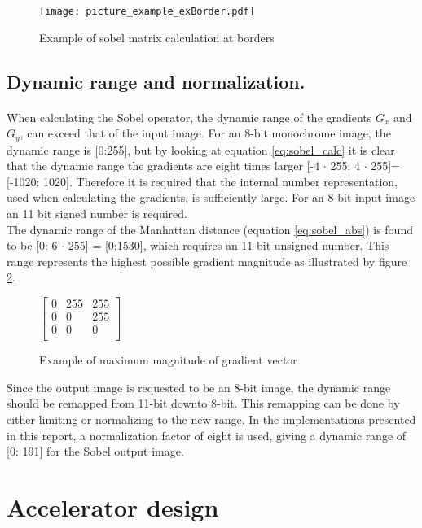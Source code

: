 \begin{figure}[H]
	\centering
	\texttt{[image: picture\_example\_exBorder.pdf]}
	\caption{Example of sobel matrix calculation at borders}
	\label{fig:pic_matrix_exBorder}
\end{figure}  

\subsection{Dynamic range and normalization.}
\paragraph*{}
When calculating the Sobel operator, the dynamic range of the gradients $G_x$ and $G_y$, can exceed that of the input image.
For an 8-bit monochrome image, the dynamic range is [0:255], but by looking at equation \ref{eq:sobel_calc} it is clear that the  dynamic range the gradients are eight times larger [-4 $\cdot$ 255: 4 $\cdot$ 255]=[-1020: 1020]. Therefore it is required that the internal number representation, used when calculating the gradients, is sufficiently large.
For an 8-bit input image an 11 bit signed number is required. \\
The dynamic range of the Manhattan distance (equation \ref{eq:sobel_abs}) is found to be [0: 6 $\cdot$ 255] = [0:1530], which requires an 11-bit unsigned number. This range represents the highest possible gradient magnitude as illustrated by figure \ref{fig:sobel_MaxRange}.

\begin{figure}[H]
\centering
$\left[ 
\begin{array}{ccc}
	0 & 255 & 255\\
    0 & 0 & 255\\
    0 & 0 & 0\\
\end{array} \right]$
\caption{Example of maximum magnitude of gradient vector}
\label{fig:sobel_MaxRange}
\end{figure}

Since the output image is requested to be an 8-bit image, the dynamic range should be remapped from 11-bit downto 8-bit. This remapping can be done by either limiting or normalizing to the new range. In the implementations presented in this report, a normalization factor of eight is used, giving a dynamic range of [0: 191] for the Sobel output image. 


\section{Accelerator design} 
\label{sec:AccDesign}

